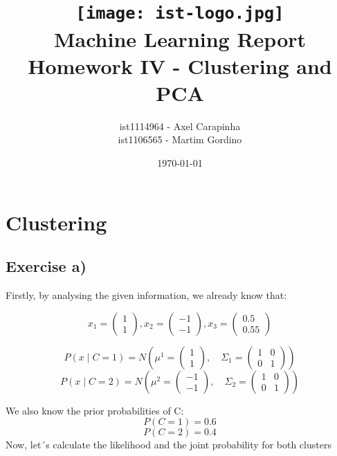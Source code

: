 \documentclass{article}
\title{
\texttt{[image: ist-logo.jpg]}\\[1ex] %
Machine Learning Report \\ 
\large Homework IV - Clustering and PCA
}
\author{ist1114964 - Axel Carapinha \\ ist1106565 - Martim Gordino}
\date{\today}
\begin{document}
\maketitle
\tableofcontents
\newpage

\section{Clustering}
\subsection{Exercise a)}

Firstly, by analysing the given information, we already know that:

\[
x_1 = \begin{pmatrix} 1 \\ 1 \end{pmatrix} , x_2 = \begin{pmatrix} -1 \\ -1 \end{pmatrix} , x_3 = \begin{pmatrix} 0.5 \\ 0.55 \end{pmatrix}
\]

\[
P(x \mid C = 1) = N\left(\mu^1 = \begin{pmatrix} 1 \\ 1 \end{pmatrix}, \quad \Sigma_1 = \begin{pmatrix} 1 & 0 \\ 0 & 1 \end{pmatrix}\right)
\]
\[
P(x \mid C = 2) = N\left(\mu^2 = \begin{pmatrix} -1 \\ -1 \end{pmatrix}, \quad \Sigma_2 = \begin{pmatrix} 1 & 0 \\ 0 & 1 \end{pmatrix}\right)
\]

We also know the prior probabilities of C:
\[
P(C = 1) = 0.6
\]
\[
P(C = 2) = 0.4
\]
\newline
Now, let´s calculate the likelihood and the joint probability for both clusters
\end{document}
